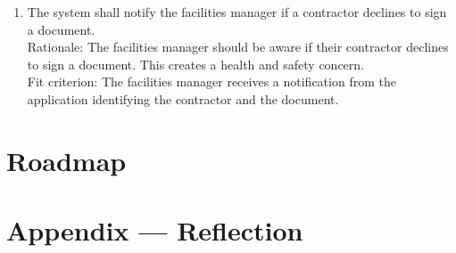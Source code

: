 \documentclass{article}
\begin{document}
\begin{enumerate}[{SFR}1.]
  \item The system shall notify the facilities manager if a contractor declines
    to sign a document.\\
    \newline Rationale: The facilities manager should be aware if
    their contractor
    declines to sign a document. This creates a health and safety concern.\\
    \newline Fit criterion: The facilities manager receives a
    notification from the
    application identifying the contractor and the document.
\end{enumerate}

\section{Roadmap}


\newpage{}

\section*{Appendix --- Reflection}


\end{document}
